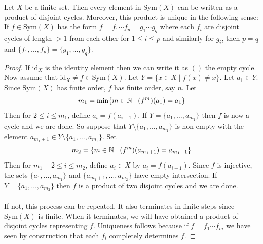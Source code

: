 \documentclass[a4paper]{article}
\begin{document}
\begin{thm}{}{} Let $X$ be a finite set. Then every element in $\text{Sym}(X)$ can be written as a product of disjoint cycles. Moreover, this product is unique in the following sense: If $f\in\text{Sym}(X)$ has the form $f=f_1\cdots f_p=g_1\cdots g_q$ where each $f_i$ are disjoint cycles of length $>1$ from each other for $1\leq i\leq p$ and similarly for $g_i$, then $p=q$ and $\{f_1,\dots,f_p\}=\{g_1,\dots,g_q\}$. \tcbline
\begin{proof}
If $\text{id}_X$ is the identity element then we can write it as $()$ the empty cycle. Now assume that $\text{id}_X\neq f\in\text{Sym}(X)$. Let $Y=\{x\in X\;|\;f(x)\neq x\}$. Let $a_1\in Y$. Since $\text{Sym}(X)$ has finite order, $f$ has finite order, say $n$. Let $$m_1=\min\{m\in\mathbb{N}\;|\;(f^m)(a_1)=a_1\}$$ Then for $2\leq i\leq m_1$, define $a_i=f(a_{i-1})$. If $Y=\{a_1,\dots,a_{m_1}\}$ then $f$ is now a cycle and we are done. So suppose that $Y\setminus\{a_1,\dots,a_{m_1}\}$ is non-empty with the element $a_{m_1+1}\in Y\setminus\{a_1,\dots,a_{m_1}\}$. Set $$m_2=\{m\in\mathbb{N}\;|\;(f^m)(a_{m_1+1})=a_{m_1+1}\}$$ Then for $m_1+2\leq i\leq m_2$, define $a_i\in X$ by $a_i=f(a_{i-1})$. Since $f$ is injective, the sets $\{a_1,\dots,a_{m_1}\}$ and $\{a_{m_1+1},\dots,a_{m_2}\}$ have empty intersection. If $Y=\{a_1,\dots,a_{m_2}\}$ then $f$ is a product of two disjoint cycles and we are done. \\~\\

If not, this process can be repeated. It also terminates in finite steps since $\text{Sym}(X)$ is finite. When it terminates, we will have obtained a product of disjoint cycles representing $f$. Uniqueness follows because if $f=f_1\cdots f_m$ we have seen by construction that each $f_i$ completely determines $f$. 
\end{proof}
\end{thm}
\end{document}
